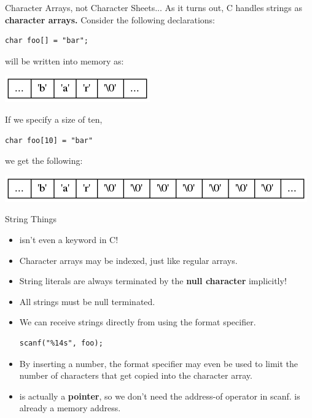\documentclass[11pt]{beamer}
\let\OldTexttt\texttt
\renewcommand{\texttt}[1]{\OldTexttt{\color{teal}{#1}}}
\begin{document}
\begin{frame}[fragile=singleslide]{Character Arrays, not Character Sheets...}
As it turns out, C handles strings as \textbf{character arrays.} Consider the following declarations:
\begin{lstlisting}[style=C]
char foo[] = "bar";
\end{lstlisting}
\texttt{foo} will be written into memory as:
\begin{center}
\includegraphics[scale=0.5]{graphs/string.png}
\end{center}
If we specify a size of ten,
\begin{lstlisting}[style=C]
char foo[10] = "bar"
\end{lstlisting}
 we get the following:
 \begin{center}
 \includegraphics[scale=0.5]{graphs/string2.png}
 \end{center}

\end{frame}

\begin{frame}[fragile=singleslide]{String Things}
\begin{itemize}
\item \texttt{string} isn't even a keyword in C! 
\item Character arrays may be indexed, just like regular arrays.
\item String literals are always terminated by the \textbf{null character} implicitly!
\item All strings must be null terminated.
\item We can receive strings directly from \texttt{scanf} using the\texttt{\%s} format specifier.
\begin{lstlisting}[style=C]
scanf("%14s", foo);
\end{lstlisting}
\item By inserting a number, the format specifier may even be used to limit the number of characters that get copied into the character array.  
\item \texttt{foo} is actually a \textbf{pointer}, so we don't need the address-of operator \texttt{\&} in scanf. \texttt{foo} is already a memory address.
\end{itemize}
\end{frame}
\end{document}
